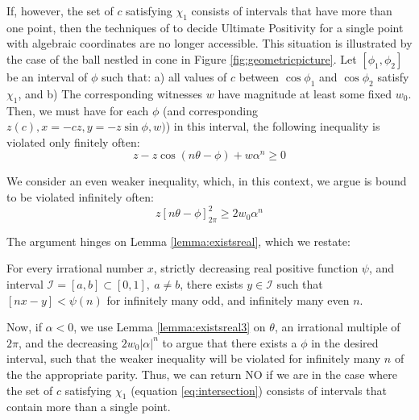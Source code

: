 If, however, the set of $c$ satisfying $\chi_1$ consists of intervals that have more than one point, then the techniques of \cite{ouaknine2014ultimate} to decide Ultimate Positivity for a single point with algebraic coordinates are no longer accessible. This situation is illustrated by the case of the ball nestled in cone in Figure \ref{fig:geometricpicture}. Let $[\phi_1, \phi_2]$ be an interval of $\phi$ such that: a) all values of $c$ between $\cos\phi_1$ and $\cos\phi_2$ satisfy $\chi_1$, and b) The corresponding witnesses $w$ have magnitude at least some fixed $w_0$. Then, we must have for each $\phi$ (and corresponding $z(c), x = -cz, y = -z\sin \phi, w)$) in this interval, the following inequality is violated only finitely often:
\begin{equation}
z - z\cos(n\theta - \phi) + w\alpha^n \ge 0
\end{equation}

We consider an even weaker inequality, which, in this context, we argue is bound to be violated infinitely often:
\begin{equation}
z[n\theta - \phi]_{2\pi}^2  \ge 2w_0\alpha^n
\end{equation}

The argument hinges on Lemma \ref{lemma:existsreal}, which we restate:
\begin{lemma}
\label{lemma:existsreal3}
For every irrational number $x$, strictly decreasing real positive function $\psi$, and interval $\mathcal{I} = [a, b] \subset [0, 1], ~ a \ne b$, there exists $y \in \mathcal{I}$ such that $[nx - y] < \psi(n)$ for infinitely many odd, and infinitely many even $n$.
\end{lemma}

Now, if $\alpha < 0$, we use Lemma \ref{lemma:existsreal3} on $\theta$, an irrational multiple of $2\pi$, and the decreasing $2w_0 |\alpha|^n$ to argue that there exists a $\phi$ in the desired interval, such that the weaker inequality will be violated for infinitely many $n$ of the the appropriate parity. Thus, we can return NO if we are in the case where the set of $c$ satisfying $\chi_1$ (equation \ref{eq:intersection}) consists of intervals that contain more than a single point.

